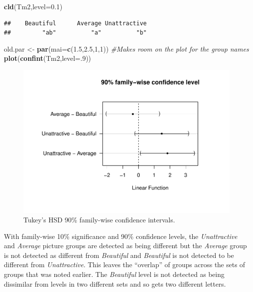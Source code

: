 \documentclass[]{book}
\newenvironment{Shaded}{\begin{snugshade}}{\end{snugshade}}
\newcommand{\KeywordTok}[1]{\textcolor[rgb]{0.13,0.29,0.53}{\textbf{#1}}}
\newcommand{\DataTypeTok}[1]{\textcolor[rgb]{0.13,0.29,0.53}{#1}}
\newcommand{\DecValTok}[1]{\textcolor[rgb]{0.00,0.00,0.81}{#1}}
\newcommand{\FloatTok}[1]{\textcolor[rgb]{0.00,0.00,0.81}{#1}}
\newcommand{\StringTok}[1]{\textcolor[rgb]{0.31,0.60,0.02}{#1}}
\newcommand{\CommentTok}[1]{\textcolor[rgb]{0.56,0.35,0.01}{\textit{#1}}}
\newcommand{\NormalTok}[1]{#1}
\theoremstyle{definition}
\theoremstyle{definition}
\theoremstyle{remark}
\begin{document}
\begin{Shaded}
\begin{Highlighting}[]
\KeywordTok{cld}\NormalTok{(Tm2,}\DataTypeTok{level=}\FloatTok{0.1}\NormalTok{)}
\end{Highlighting}
\end{Shaded}

\begin{verbatim}
##    Beautiful      Average Unattractive 
##         "ab"          "a"          "b"
\end{verbatim}

\begin{Shaded}
\begin{Highlighting}[]
\NormalTok{old.par <-}\StringTok{ }\KeywordTok{par}\NormalTok{(}\DataTypeTok{mai=}\KeywordTok{c}\NormalTok{(}\FloatTok{1.5}\NormalTok{,}\FloatTok{2.5}\NormalTok{,}\DecValTok{1}\NormalTok{,}\DecValTok{1}\NormalTok{)) }\CommentTok{#Makes room on the plot for the group names}
\KeywordTok{plot}\NormalTok{(}\KeywordTok{confint}\NormalTok{(Tm2,}\DataTypeTok{level=}\NormalTok{.}\DecValTok{9}\NormalTok{))}
\end{Highlighting}
\end{Shaded}

\begin{figure}
\centering
\includegraphics{03-oneWayAnova_files/figure-latex/Figure3-22-1.pdf}
\caption{\label{fig:Figure3-22}Tukey's HSD 90\% family-wise confidence intervals.}
\end{figure}

With family-wise 10\% significance and 90\% confidence levels, the
\emph{Unattractive} and \emph{Average} picture groups are detected as
being different but the \emph{Average} group is not detected as
different from \emph{Beautiful} and \emph{Beautiful} is not detected to
be different from \emph{Unattractive}. This leaves the ``overlap'' of
groups across the sets of groups that was noted earlier. The
\emph{Beautiful} level is not detected as being dissimilar from levels
in two different sets and so gets two different letters.
\end{document}
